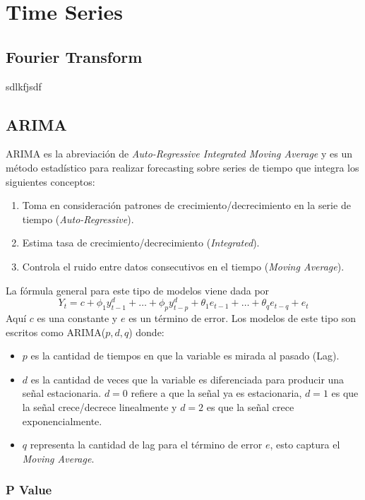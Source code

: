 \chapter{Time Series}

\section{Fourier Transform}

sdlkfjsdf 

\section{ARIMA}

ARIMA es la abreviación de \textit{Auto-Regressive Integrated Moving Average} y es un método estadístico para realizar forecasting sobre series de tiempo que integra los siguientes conceptos:

\begin{enumerate}
    \item Toma en consideración patrones de crecimiento/decrecimiento en la serie de tiempo (\textit{Auto-Regressive}). 
    \item Estima tasa de crecimiento/decrecimiento (\textit{Integrated}).
    \item Controla el ruido entre datos consecutivos en el tiempo (\textit{Moving Average}).
\end{enumerate}

La fórmula general para este tipo de modelos viene dada por 
$$
Y_t = c + \phi_1y^d_{t-1} + \dots + \phi_py^d_{t-p} + \theta_1e_{t-1} + \dots + \theta_q e_{t-q} + e_t
$$
Aquí $c$ es una constante y $e$ es un término de error. Los modelos de este tipo son escritos como ARIMA($p,d,q$) donde: 

\begin{itemize}
    \item $p$ es la cantidad de tiempos en que la variable es mirada al pasado (Lag).
    \item $d$ es la cantidad de veces que la variable es diferenciada para producir una señal estacionaria. $d=0$ refiere a que la señal ya es estacionaria, $d=1$ es que la señal crece/decrece linealmente y $d=2$ es que la señal crece exponencialmente. 
    \item $q$ representa la cantidad de lag para el término de error $e$, esto captura el \textit{Moving Average}.
\end{itemize}

\subsection{P Value}

